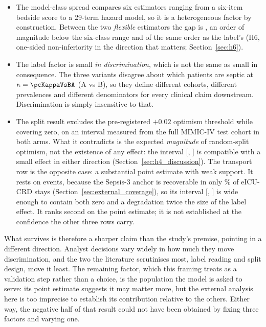 \begin{itemize}
    \item The model-class spread compares six estimators ranging from a
          six-item bedside score to a 29-term hazard model, so it is a
          heterogeneous factor by construction. Between the two \emph{flexible}
          estimators the gap is \pcHSixAbsEst{}, an order of magnitude below
          the six-class range and of the same order as the label's
          (H6, one-sided non-inferiority in the direction that matters;
          Section~\ref{sec:h6}).
    \item The label factor is small \emph{in discrimination}, which is not the
          same as small in consequence. The three variants disagree about which
          patients are septic at $\kappa = \pcKappaVsBA$ (A vs B), so they
          define different cohorts, different prevalences and different
          denominators for every clinical claim downstream. Discrimination is
          simply insensitive to that.
    \item The split result excludes the pre-registered $+0.02$ optimism
          threshold while covering zero, on an interval measured from the full
          MIMIC-IV test cohort in both arms. What it contradicts is the
          expected \emph{magnitude} of random-split optimism, not the
          existence of any effect: the interval
          [\pcHFourCiLo, \pcHFourCiHi] is compatible with a small effect in
          either direction (Section~\ref{sec:h4_discussion}). The
          transport row is the opposite case: a substantial point estimate
          with weak support. It rests on \pcExtNEventsB{} events, because the
          Sepsis-3 anchor is recoverable in only \pcExtMicroCoverage\% of
          eICU-CRD stays (Section~\ref{sec:external_coverage}), so its interval
          [\pcHFiveCiLo, \pcHFiveCiHi] is wide enough to contain both zero and
          a degradation twice the size of the label effect. It ranks second on
          the point estimate; it is not established at the confidence the other
          three rows carry.
\end{itemize}

What survives is therefore a sharper claim than the study's premise, pointing
in a different direction. Analyst decisions vary widely in how much they move
discrimination, and the two the literature scrutinises most, label reading
and split design, move it least. The remaining factor, which this framing
treats as a validation step rather than a choice, is the population the model
is asked to serve: its point estimate suggests it may matter more, but the
external analysis here is too imprecise to establish its contribution relative
to the others. Either way, the negative half of that result could not have been
obtained by fixing three factors and varying one.

